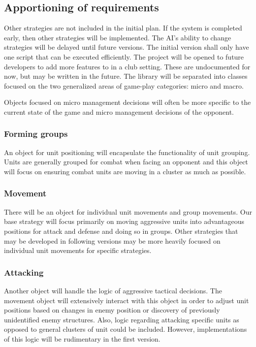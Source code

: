 \subsection{Apportioning of requirements}
Other strategies are not included in the initial plan. If the system is completed early, then other strategies will be implemented.
The AI's ability to change strategies will be delayed until future versions. The initial version shall only have one script that can be executed efficiently.
The project will be opened to future developers to add more features to in a club setting. These are undocumented for now, but may be written in the future. The library will be separated into classes focused on the two generalized areas of game-play categories: micro and macro.

Objects focused on micro management decisions will often be more specific to the current state of the game and micro management decisions of the opponent.

\subsubsection{Forming groups}
An object for unit positioning will encapsulate the functionality of unit grouping. Units are generally grouped for combat when facing an opponent and this object will focus on ensuring combat units are moving in a cluster as much as possible. 

\subsubsection{Movement}
There will be an object for individual unit movements and group movements. Our base strategy will focus primarily on moving aggressive units into advantageous positions for attack and defense and doing so in groups. Other strategies that may be developed in following versions may be more heavily focused on individual unit movements for specific strategies. 

\subsubsection{Attacking}
Another object will handle the logic of aggressive tactical decisions. The movement object will extensively interact with this object in order to adjust unit positions based on changes in enemy position or discovery of previously unidentified enemy structures. Also, logic regarding attacking specific units as opposed to general clusters of unit could be included. However, implementations of this logic will be rudimentary in the first version. 

